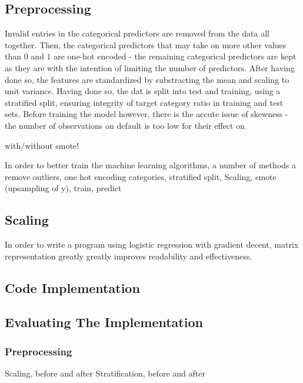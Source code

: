 \documentclass[%
oneside,                 %
final,                   %
10pt]{article}
\begin{document}
\subsection{Preprocessing}
Invalid entries in the categorical predictors are removed from the data all together. Then, the categorical predictors that may take on more other values than $0$ and $1$ are one-hot encoded - the remaining categorical predictors are kept as they are with the intention of limiting the number of predictors. After having done so, the features are standardized by substracting the mean and scaling to unit variance.  Having done so, the dat is split into test and training, using a stratified split, ensuring integrity of target category ratio in training and test sets. Before training the model however, there is the accute issue of skewness - the number of observations on default is too low for their effect on 

with/without smote!


In order to better train the machine learning algorithms, a number of methods a
remove outliers,  one hot encoding categories, stratified split, Scaling, smote (upsampling of y), train, predict
\subsection{Scaling} \label{Section_M_Scaling}
 \label{Section_M_Matrixrep}
In order to write a program using logistic regression with gradient decent, matrix representation greatly greatly improves readability and effectiveness. 



\subsection{Code Implementation} \label{Section_M_Codeimpl}
\subsection{Evaluating The Implementation} \label{Section_M_eval}

\subsubsection{Preprocessing}
Scaling, before and after
Stratification, before and after
\end{document}
